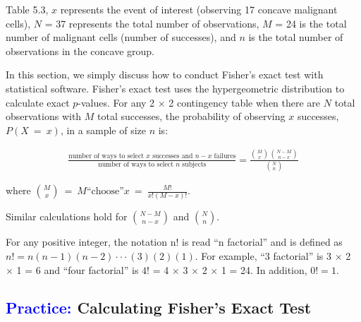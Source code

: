 \documentclass[
]{report}
\begin{document}
Table 5.3, \(\scriptstyle x\) represents the event of interest (observing 17 concave malignant cells), \(\scriptstyle N\) = 37 represents the total number of observations, \(\scriptstyle M\) = 24 is the total number of malignant cells (number of successes), and \(\scriptstyle n\) is the total number of observations in the concave group.

In this section, we simply discuss how to conduct Fisher's exact test with statistical software. Fisher's exact test uses the hypergeometric distribution to calculate exact \(\scriptstyle p\)-values. For any 2 × 2 contingency table when there are \(\scriptstyle N\) total observations with \(\scriptstyle M\) total successes, the probability of observing \(\scriptstyle x\) successes, \(\scriptstyle P(X \ = \ x)\), in a sample of size \(\scriptstyle n\) is:

\begin{align*}
\frac{\text{number of ways to select $x$ successes and $n - x$ failures}}{\text{number of ways to select $n$ subjects}}
 = \frac{\binom{M}{x}\,\binom{N - M}{n - x}}{\binom{N}{n}} 
\end{align*}

where \(\binom{M}{x} \ =\  M \text{“choose”} x \ =\  \frac{M!}{x!(M - x)!}\).

Similar calculations hold for \(\scriptstyle \binom{N - M}{n - x}\) and \(\scriptstyle \binom{N}{n}\).

For any positive integer, the notation n! is read ``n factorial'' and is defined as \(\scriptstyle n!= n(n- 1)(n- 2) \cdot\cdot\cdot (3)(2)(1)\). For example, ``3 factorial'' is 3 \(\times\) 2 \(\times\) 1 = 6 and ``four factorial'' is \(\scriptstyle 4!\) = 4 \(\times\) 3 \(\times\) 2 \(\times\) 1 = 24. In addition, \(\scriptstyle 0!= 1\).

\hypertarget{calculating-fishers-exact-test}{%
\subsection*{\texorpdfstring{\textcolor{blue}{Practice:} Calculating Fisher's Exact Test}{ Calculating Fisher's Exact Test}}\label{calculating-fishers-exact-test}}
\end{document}
